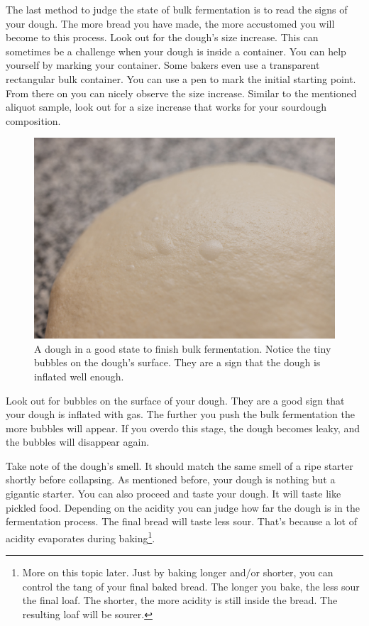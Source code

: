 The last method to judge the state of bulk fermentation
is to read the signs of your dough. The more bread you have
made, the more accustomed you will become to this process.
Look out for the dough's size increase. This can sometimes
be a challenge when your dough is inside a container.
You can help yourself by marking your container. Some bakers
even use a transparent rectangular bulk container. You
can use a pen to mark the initial starting point. From there
on you can nicely observe the size increase. Similar to the
mentioned aliquot sample, look out for a size increase that works
for your sourdough composition.

\begin{figure}[!htb]
  \centering
  \includegraphics[width=\textwidth]{bulk-finished-dough}
  \caption[Dough at the end of bulk fermentation]{A dough in a good state to
      finish bulk fermentation. Notice the tiny bubbles on the dough's surface.
      They are a sign that the dough is inflated well enough.}
\end{figure}

Look out for bubbles on the surface of your dough. They
are a good sign that your dough is inflated with gas. The
further you push the bulk fermentation the more bubbles
will appear. If you overdo this stage, the dough becomes leaky, and
the bubbles will disappear again.

Take note of the dough's smell. It should match the same
smell of a ripe starter shortly before collapsing. As mentioned
before, your dough is nothing but a gigantic starter. You
can also proceed and taste your dough. It will taste like
pickled food. Depending on the acidity you can judge how
far the dough is in the fermentation process. The final bread
will taste less sour. That's because a lot of acidity evaporates
during baking\footnote{More on this topic later.
Just by baking longer and/or shorter, you can control
the tang of your final baked bread. The longer
you bake, the less sour the final loaf. The shorter,
the more acidity is still inside the bread. The resulting
loaf will be sourer.}.

